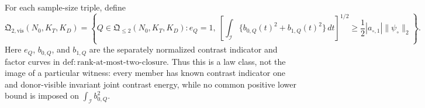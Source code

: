 For each sample-size triple, define
\[
 \mathfrak Q_{2,\mathrm{vis}}(N_0,K_T,K_D)
 =\left\{Q\in\mathfrak Q_{\leq2}(N_0,K_T,K_D):
 e_Q=1,\ 
 \left[\int_{\mathcal I}\{b_{0,Q}(t)^2+b_{1,Q}(t)^2\}\,dt\right]^{1/2}
 \ge \frac12|a_{\circ,1}|\|\psi_\circ\|_2\right\}.
\]
Here \(e_Q\), \(b_{0,Q}\), and \(b_{1,Q}\) are the separately normalized contrast indicator and factor curves in \(\mathrm{def:rank\mbox{-}at\mbox{-}most\mbox{-}two\mbox{-}closure}\).  Thus this is a law class, not the image of a particular witness: every member has known contrast indicator one and donor-visible invariant joint contrast energy, while no common positive lower bound is imposed on \(\int_{\mathcal I}b_{0,Q}^2\).